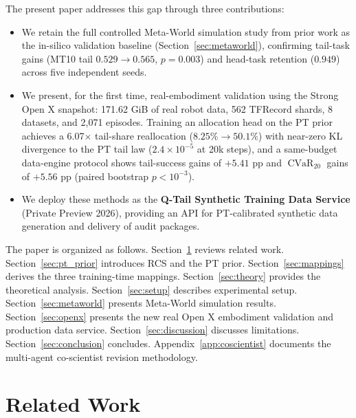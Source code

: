 \documentclass[10pt]{article}
\DeclareMathOperator{\CVaR}{CVaR}
\begin{document}
The present paper addresses this gap through three contributions:

\begin{itemize}
  \item We retain the full controlled Meta-World simulation study from prior work as the
    in-silico validation baseline (Section~\ref{sec:metaworld}), confirming tail-task gains
    (MT10 tail $0.529\to0.565$, $p=0.003$) and head-task retention ($0.949$) across
    five independent seeds.
  \item We present, for the first time, real-embodiment validation using the Strong Open X
    snapshot: 171.62 GiB of real robot data, 562 TFRecord shards, 8 datasets, and 2,071
    episodes.  Training an allocation head on the PT prior achieves a 6.07$\times$
    tail-share reallocation ($8.25\%\to50.1\%$) with near-zero KL divergence to the PT tail
    law ($2.4\times10^{-5}$ at 20k steps), and a same-budget data-engine protocol shows
    tail-success gains of $+5.41$ pp and $\CVaR_{20}$ gains of $+5.56$ pp (paired
    bootstrap $p<10^{-3}$).
  \item We deploy these methods as the \textbf{Q-Tail Synthetic Training Data Service}
    (Private Preview 2026), providing an API for PT-calibrated synthetic data generation
    and delivery of audit packages.
\end{itemize}

The paper is organized as follows.  Section~\ref{sec:related} reviews related work.
Section~\ref{sec:pt_prior} introduces RCS and the PT prior.  Section~\ref{sec:mappings}
derives the three training-time mappings.  Section~\ref{sec:theory} provides the
theoretical analysis.  Section~\ref{sec:setup} describes experimental setup.
Section~\ref{sec:metaworld} presents Meta-World simulation results.
Section~\ref{sec:openx} presents the new real Open X embodiment validation and production
data service.  Section~\ref{sec:discussion} discusses limitations.
Section~\ref{sec:conclusion} concludes.  Appendix~\ref{app:coscientist} documents the
multi-agent co-scientist revision methodology.

\section{Related Work}
\label{sec:related}
\end{document}
